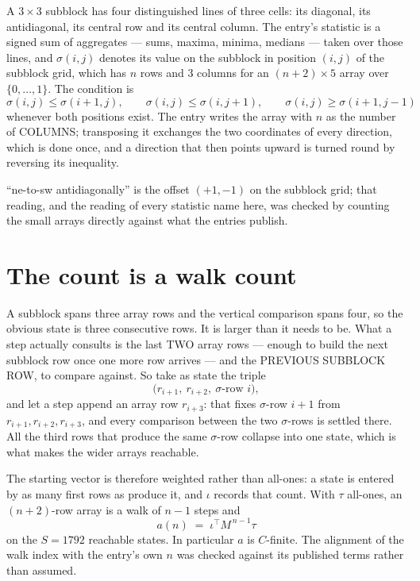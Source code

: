 \documentclass[11pt,a4paper]{article}
\theoremstyle{plain}
\theoremstyle{definition}
\begin{document}
A $3\times3$ subblock has four distinguished lines of three cells: its diagonal, its
antidiagonal, its central row and its central column. The entry's statistic is a signed sum of
aggregates --- sums, maxima, minima, medians --- taken over those lines, and $\sigma(i,j)$
denotes its value on the subblock in position $(i,j)$ of the subblock grid, which has $n$ rows
and $3$ columns for an $(n+2)\times5$ array over $\{0,\dots,1\}$. The condition is
\[
\sigma(i,j)\le\sigma(i+1,j),\qquad \sigma(i,j)\le\sigma(i,j+1),\qquad \sigma(i,j)\ge\sigma(i+1,j-1)
\]
whenever both positions exist. The entry writes the array with $n$ as the number of COLUMNS; transposing it exchanges the two coordinates of every direction, which is done once, and a direction that then points upward is turned round by reversing its inequality.

``ne-to-sw antidiagonally'' is the offset $(+1,-1)$ on the subblock grid; that reading, and
the reading of every statistic name here, was checked by counting the small arrays directly
against what the entries publish.

\section{The count is a walk count}

A subblock spans three array rows and the vertical comparison spans four, so the obvious state
is three consecutive rows. It is larger than it needs to be. What a step actually consults is
the last TWO array rows --- enough to build the next subblock row once one more row arrives ---
and the PREVIOUS SUBBLOCK ROW, to compare against. So take as state the triple
\[
\bigl(r_{i+1},\ r_{i+2},\ \sigma\text{-row }i\bigr),
\]
and let a step append an array row $r_{i+3}$: that fixes $\sigma$-row $i+1$ from
$r_{i+1},r_{i+2},r_{i+3}$, and every comparison between the two $\sigma$-rows is settled
there. All the third rows that produce the same $\sigma$-row collapse into one state, which is
what makes the wider arrays reachable.

The starting vector is therefore weighted rather than all-ones: a state is entered by as many
first rows as produce it, and $\iota$ records that count. With $\tau$ all-ones, an
$(n+2)$-row array is a walk of $n-1$ steps and
\[
a(n)\;=\;\iota^{\!\top}M^{\,n-1}\tau
\]
on the $S=1792$ reachable states. In particular $a$ is $C$-finite. The alignment of the walk
index with the entry's own $n$ was checked against its published terms rather than assumed.
\end{document}
